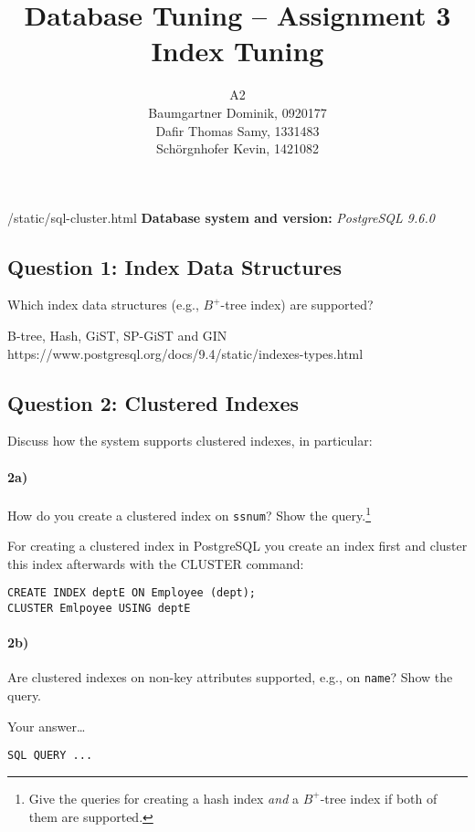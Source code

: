\documentclass[11pt]{scrartcl}
\title{
  \textbf{\large Database Tuning -- Assignment 3}\\
  Index Tuning
}
\author{
 A2\\
\large Baumgartner Dominik, 0920177 \\
\large Dafir Thomas Samy, 1331483 \\
\large Sch\"orgnhofer Kevin, 1421082
}
\begin{document}
\maketitle

/static/sql-cluster.html
\noindent\textbf{Database system and version:} {\it PostgreSQL 9.6.0}

\subsection*{Question 1: Index Data Structures} Which index data structures (e.g., $B^+$-tree
index) are supported?

\smallskip

B-tree, Hash, GiST, SP-GiST and GIN\\
https://www.postgresql.org/docs/9.4/static/indexes-types.html

\subsection*{Question 2: Clustered Indexes} Discuss how the system
supports clustered indexes, in particular:

\paragraph{2a)} How do you create a clustered index on {\tt ssnum}?
Show the query.\footnote{Give the queries for creating a hash index
  \emph{and} a $B^+$-tree index if both of them are supported.}

\smallskip

For creating a clustered index in PostgreSQL you create an index first and cluster this index afterwards with the CLUSTER command:

{\small
\begin{verbatim}
CREATE INDEX deptE ON Employee (dept);
CLUSTER Emlpoyee USING deptE
\end{verbatim}
}

\paragraph{2b)} Are clustered indexes on non-key attributes supported, e.g.,
on {\tt name}?  Show the query.

\smallskip

Your answer\dots

{\small
\begin{verbatim}
SQL QUERY ...
\end{verbatim}
}
\end{document}
